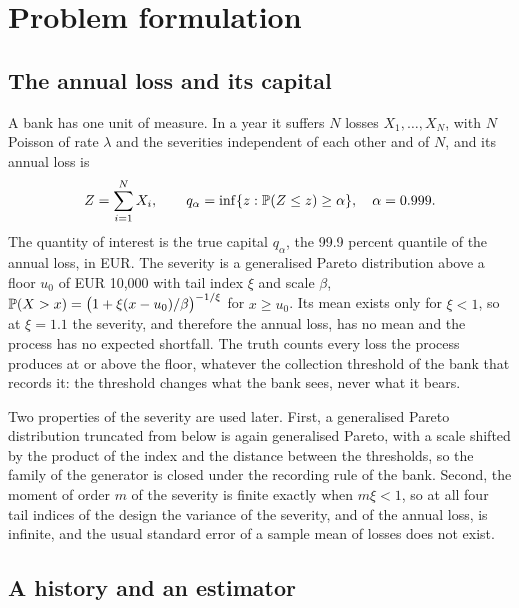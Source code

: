 \section{Problem formulation}
\label{sec:problem}

\subsection{The annual loss and its capital}
\label{sec:problem-capital}

A bank has one unit of measure. In a year it suffers $N$ losses $X_1,\dots,X_N$, with $N$ Poisson of rate $\lambda$ and the severities independent of each other and of $N$, and its annual loss is
\begin{equation}
Z=\sum_{i=1}^{N}X_i,\qquad q_\alpha=\inf\{z:\mathbb{P}(Z\le z)\ge\alpha\},\quad \alpha=0.999 .
\label{eq:annual-loss}
\end{equation}
The quantity of interest is the true capital $q_\alpha$, the 99.9 percent quantile of the annual loss, in EUR. The severity is a generalised Pareto distribution above a floor $u_0$ of EUR 10,000 with tail index $\xi$ and scale $\beta$,
$\mathbb{P}(X>x)=\bigl(1+\xi(x-u_0)/\beta\bigr)^{-1/\xi}$ for $x\ge u_0$. Its mean exists only for $\xi<1$, so at $\xi=1.1$ the severity, and therefore the annual loss, has no mean and the process has no expected shortfall.
The truth counts every loss the process produces at or above the floor, whatever the collection threshold of the bank that records it: the threshold changes what the bank sees, never what it bears.

Two properties of the severity are used later. First, a generalised Pareto distribution truncated from below is again generalised Pareto, with a scale shifted by the product of the index and the distance between the thresholds, so the family of the generator is closed under the recording rule of the bank. Second, the moment of order $m$ of the severity is finite exactly when $m\xi<1$, so at all four tail indices of the design the variance of the severity, and of the annual loss, is infinite, and the usual standard error of a sample mean of losses does not exist.

\subsection{A history and an estimator}
\label{sec:problem-history}


